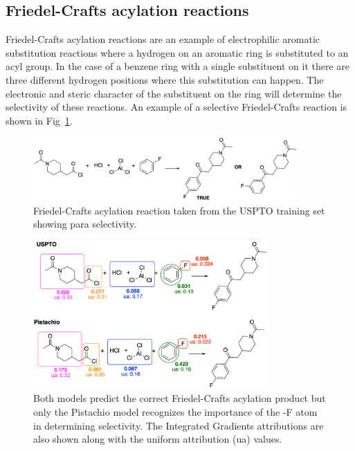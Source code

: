 \subsection{Friedel-Crafts acylation reactions}
\label{subsec:friedel}
Friedel-Crafts acylation reactions are an example of electrophilic aromatic substitution reactions \cite{Clayden2012, Friedel1877SurEtc.} where a hydrogen on an aromatic ring is substituted to an acyl group. In the case of a benzene ring with a single substituent on it there are three different hydrogen positions where this substitution can happen. The electronic and steric character of the substituent on the ring will determine the selectivity of these reactions. An example of a selective Friedel-Crafts reaction is shown in Fig~\ref{fig:sear}. 

\begin{figure}[htbp!] 
\centering    
\includegraphics[width=0.9\textwidth]{Chapters/Ch4/Figs/sear.png}
\caption[FC]{Friedel-Crafts acylation reaction taken from the USPTO training set showing para selectivity.}
\label{fig:sear}
\end{figure}

\begin{figure}[htbp!] 
\centering    
\includegraphics[width=0.8\textwidth]{Chapters/Ch4/Figs/sear_pred.png}
\caption[FC IG]{Both models predict the correct Friedel-Crafts acylation product but only the Pistachio model recognizes the importance of the -F atom in determining selectivity. The Integrated Gradients attributions are also shown along with the uniform attribution (ua) values. }
\label{fig:sear_pred}
\end{figure}

